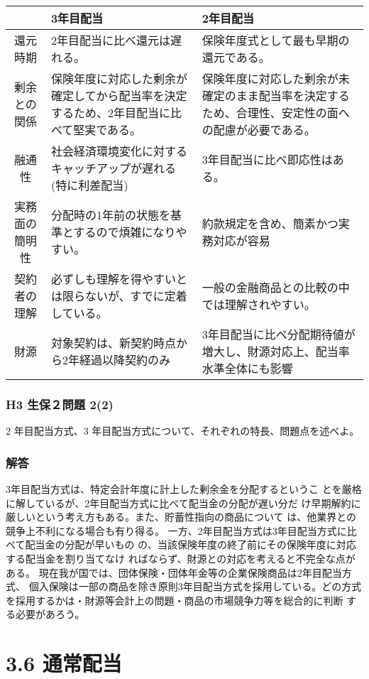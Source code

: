 \documentclass[report,gutter=10mm,fore-edge=10mm,uplatex,dvipdfmx]{jlreq}
\begin{document}
\begin{tabularx}{\linewidth}{|c|X|X|}
 \hline
 &3年目配当 & 2年目配当\\ \hline
還元時期 &2年目配当に比べ還元は遅れる。 & 保険年度式として最も早期の還元である。\\ \hline
剰余との関係 & 保険年度に対応した剰余が確定してから配当率を決定するため、2年目配当に比べて堅実である。
& 保険年度に対応した剰余が未確定のまま配当率を決定するため、合理性、安定性の面への配慮が必要である。\\ \hline
融通性 & 社会経済環境変化に対するキャッチアップが遅れる(特に利差配当)
& 3年目配当に比べ即応性はある。\\ \hline
実務面の簡明性 & 分配時の1年前の状態を基準とするので煩雑になりやすい。
& 約款規定を含め、簡素かつ実務対応が容易\\ \hline
契約者の理解 & 必ずしも理解を得やすいとは限らないが、すでに定着している。
& 一般の金融商品との比較の中では理解されやすい。\\ \hline
財源 & 対象契約は、新契約時点から2年経過以降契約のみ
& 3年目配当に比べ分配期待値が増大し、財源対応上、配当率水準全体にも影響
\\ \hline
\end{tabularx}

\subsubsection{H3 生保２問題 2(2)}
2 年目配当方式、3 年目配当方式について、それぞれの特長、問題点を述べよ。
\subsubsection{解答}
3年目配当方式は、特定会計年度に計上した剰余金を分配するというこ
とを厳格に解しているが、2年目配当方式に比べて配当金の分配が遅い分だ
け早期解約に厳しいという考え方もある。また、貯蓄性指向の商品について
は、他業界との競争上不利になる場合も有り得る。
一方、2年目配当方式は3年目配当方式に比べて配当金の分配が早いもの
の、当該保険年度の終了前にその保険年度に対応する配当金を割り当てなけ
ればならず、財源との対応を考えると不完全な点がある。
現在我が国では、団体保険・団体年金等の企業保険商品は2年目配当方式、
個入保険は一部の商品を除き原則3年目配当方式を採用している。どの方式
を採用するかは・財源等会計上の問題・商品の市場競争力等を総合的に判断
する必要があろう。

\section{3.6 通常配当}
\end{document}
